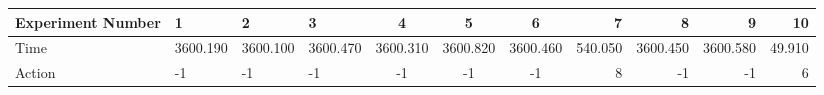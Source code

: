 \documentclass[8pt]{article}
\begin{document}
\begin{landscape}
\begin{tabular}{ | l | l | l | l | c | c | c | r | r | r | r | }
 \hline 
Experiment Number & 1 & 2 & 3 & 4 & 5 & 6 & 7 & 8 & 9 & 10\\ \hline
Time & 3600.190 & 3600.100 & 3600.470 & 3600.310 & 3600.820 & 3600.460 & 540.050 & 3600.450 & 3600.580 & 49.910\\ \hline
Action & -1 & -1 & -1 & -1 & -1 & -1 & 8 & -1 & -1 & 6\\ \hline\end{tabular}
\end{landscape}
\end{document}
